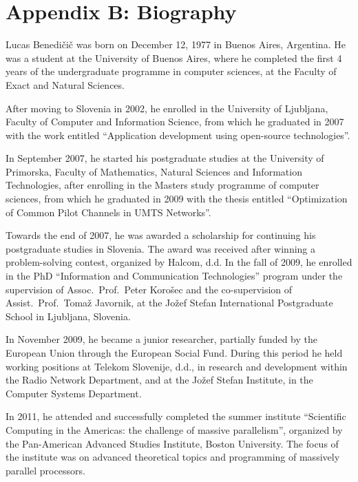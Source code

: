 
\chapter*{{\Large{\vspace{-2.3cm}Appendix B: Biography}}}

\noindent \fancyhead{}
\fancyfoot{} 
\fancyhead[RO]{\footnotesize \thepage}
\fancyhead[LE]{\footnotesize \thepage}

\noindent Lucas Benedi\v{c}i\v{c} was born on December 12, 1977 in
Buenos Aires, Argentina. He was a student at the University of Buenos
Aires, where he completed the first 4 years of the undergraduate programme
in computer sciences, at the Faculty of Exact and Natural Sciences.

After moving to Slovenia in 2002, he enrolled in the University of
Ljubljana, Faculty of Computer and Information Science, from which
he graduated in 2007 with the work entitled ``Application development
using open-source technologies''.

In September 2007, he started his postgraduate studies at the University
of Primorska, Faculty of Mathematics, Natural Sciences and Information
Technologies, after enrolling in the Masters study programme of computer
sciences, from which he graduated in 2009 with the thesis entitled
``Optimization of Common Pilot Channels in UMTS Networks''.

Towards the end of 2007, he was awarded a scholarship for continuing
his postgraduate studies in Slovenia. The award was received after
winning a problem-solving contest, organized by Halcom, d.d. In the
fall of 2009, he enrolled in the PhD ``Information and Communication
Technologies'' program under the supervision of Assoc.~Prof.~Peter
Koro\v{s}ec and the co-supervision of Assist.~Prof.~Toma\v{z}
Javornik, at the Jo\v{z}ef Stefan International Postgraduate School
in Ljubljana, Slovenia.

In November 2009, he became a junior researcher, partially funded
by the European Union through the European Social Fund. During this
period he held working positions at Telekom Slovenije, d.d., in research
and development within the Radio Network Department, and at the Jo\v{z}ef
Stefan Institute, in the Computer Systems Department.

In 2011, he attended and successfully completed the summer institute
``Scientific Computing in the Americas: the challenge of massive
parallelism'', organized by the Pan-American Advanced Studies Institute,
Boston University. The focus of the institute was on advanced theoretical
topics and programming of massively parallel processors.


